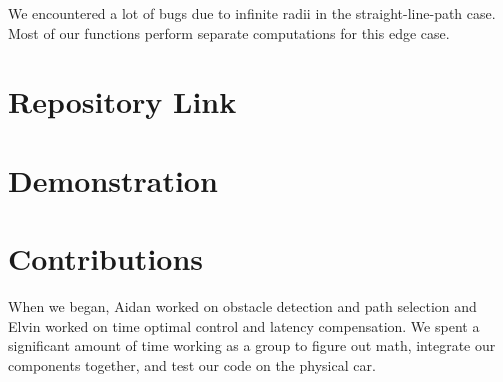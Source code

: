 \documentclass[11pt]{article}
\begin{document}
We encountered a lot of bugs due to infinite radii in the straight-line-path
case. Most of our functions perform separate computations for this edge case.

\section{Repository Link}

\section{Demonstration}

\section{Contributions}

When we began, Aidan worked on obstacle detection and path selection and Elvin
worked on time optimal control and latency compensation. We spent a significant
amount of time working as a group to figure out math, integrate our
components together, and test our code on the physical car.
\end{document}
